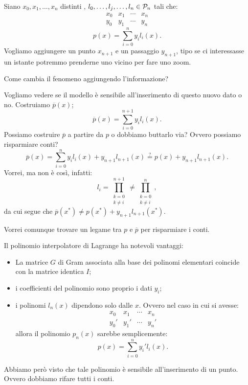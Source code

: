 \begin{osse}
Siano $x_0, x_1, \ldots, x_n$ distinti , $l_0, \ldots,l_j, \ldots, l_n \in
\mathcal{P}_n$ tali che:
\[\begin{array}{cccc}
x_0 & x_1 & \cdots & x_n \\
y_0 & y_1 & \cdots & y_n
\end{array}\]
\[p(x) = \sum_{i=0}^ny_il_i(x).\]
Vogliamo aggiungere un punto $x_{n+1}$ e un passaggio $y_{n+1}$, tipo se ci
interessasse un istante potremmo prenderne uno vicino per fare uno zoom.

Come cambia il fenomeno aggiungendo l'informazione?

Vogliamo vedere se il modello è sensibile all'inserimento di questo nuovo dato
o no. Costruiamo $\overline{p}(x)$;
 \[\overline{p}(x) = \sum_{i=0}^{n+1}y_il_i(x).\]
Possiamo costruire $\overline{p}$ a partire da $p$ o dobbiamo buttarlo via?
Ovvero possiamo risparmiare conti?
\[
\overline{p}(x) = \sum_{i=0}^ny_il_i(x) + y_{n+1}l_{n+1}(x)
\stackrel{?}{=} p(x) + y_{n+1}l_{n+1}(x).
\]
Vorrei, ma non è così, infatti:
\[l_i = \prod_{\substack{k=0\\ k \neq i }}^{n+1} \neq
\prod_{\substack{k=0\\ k \neq i }}^n,\]
da cui segue che $\overline{p}(x^*) \neq p(x^*) + y_{n+1}l_{n+1}(x^*)$.
\begin{flushleft}
Vorrei comunque trovare un legame tra $p$ e  $\overline{p}$ per risparmiare
i conti.
\end{flushleft}
\end{osse}

\begin{osse}
Il polinomio interpolatore di Lagrange ha notevoli vantaggi:
\begin{itemize}
\item La matrice $G$ di Gram associata alla base dei polinomi elementari
coincide con la matrice identica $I$;
\item i coefficienti del polinomio sono proprio i dati $y_i$;
\item i polinomi $l_n(x)$ dipendono solo dalle $x$. Ovvero nel caso in cui si
avesse:
\[\begin{array}{cccc}
x_0 & x_1 & \cdots & x_n \\
y_0' & y_1' & \cdots & y_n'
\end{array}\]
allora il polinomio $p_n(x)$ sarebbe semplicemente:
\[p(x) = \sum_{i=0}^ny_i'l_i(x).\]
\end{itemize}
Abbiamo però visto che tale polinomio è sensibile all'inserimento di un
punto. Ovvero dobbiamo rifare tutti i conti.
\end{osse}

